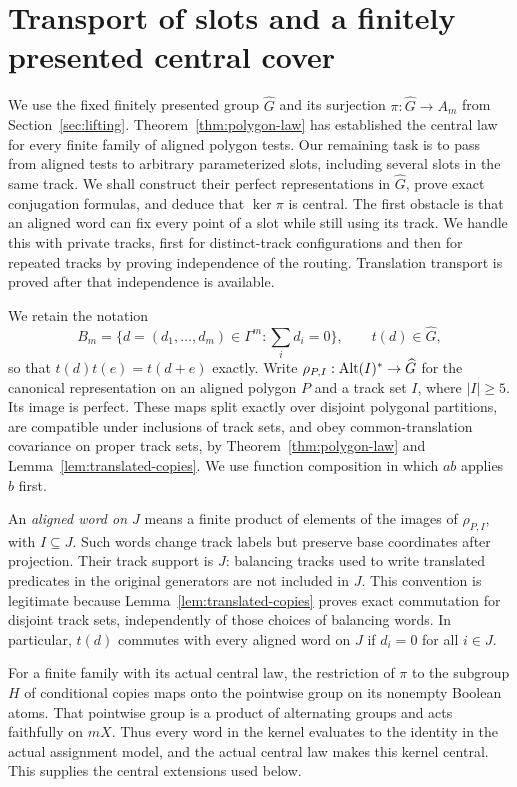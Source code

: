 \section{Transport of slots and a finitely presented central cover}
\label{sec:transport}

We use the fixed finitely presented group $\widehat G$ and its surjection
$\pi:\widehat G\to A_m$ from Section~\ref{sec:lifting}.  Theorem~\ref{thm:polygon-law}
has established the central law for every finite family of aligned polygon
tests.  Our remaining task is to pass from aligned tests to arbitrary
parameterized slots, including several slots in the same track.  We shall
construct their perfect representations in $\widehat G$, prove exact
conjugation formulas, and deduce that $\ker\pi$ is central.
The first obstacle is that an aligned word can fix every point of a
slot while still using its track.  We handle this with private tracks,
first for distinct-track configurations and then for repeated tracks
by proving independence of the routing.  Translation transport is
proved after that independence is available.

We retain the notation
\[
 B_m=\{d=(d_1,\ldots,d_m)\in\Gamma^m:\textstyle\sum_i d_i=0\},
 \qquad t(d)\in\widehat G,
\]
so that $t(d)t(e)=t(d+e)$ exactly.  Write
$\rho_{P,I}:\operatorname{Alt}(I)^\ast\to\widehat G$ for the canonical representation on
an aligned polygon $P$ and a track set $I$, where $|I|\geq5$.  Its image
is perfect.  These maps split exactly over disjoint polygonal partitions,
are compatible under inclusions of track sets, and obey common-translation
covariance on proper track sets, by Theorem~\ref{thm:polygon-law} and
Lemma~\ref{lem:translated-copies}.  We use function composition in which
$ab$ applies $b$ first.

An \emph{aligned word on $J$} means a finite product of elements of the
images of $\rho_{P,I}$, with $I\subseteq J$.  Such words change track labels
but preserve base coordinates after projection.  Their track support is
$J$: balancing tracks used to write translated predicates in the original
generators are not included in $J$.  This convention is legitimate because
Lemma~\ref{lem:translated-copies} proves exact commutation for disjoint
track sets, independently of those choices of balancing words.  In
particular, $t(d)$ commutes with every aligned word on $J$ if $d_i=0$ for
all $i\in J$.

For a finite family with its actual central law, the restriction of
$\pi$ to the subgroup $H$ of conditional copies maps onto the
pointwise group on its nonempty Boolean atoms.  That pointwise group
is a product of alternating groups and acts faithfully on $mX$.
Thus every word in the kernel evaluates to the identity in the actual
assignment model, and the actual central law makes this kernel central.
This supplies the central extensions used below.

